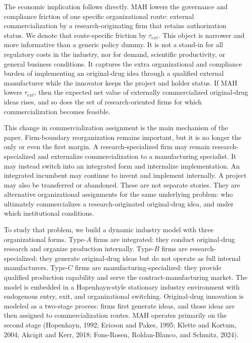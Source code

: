 The economic implication follows directly. MAH lowers the governance and compliance friction of one specific organizational route: external commercialization by a research-originating firm that retains authorization status. We denote that route-specific friction by $\tau_{ext}$. This object is narrower and more informative than a generic policy dummy. It is not a stand-in for all regulatory costs in the industry, nor for demand, scientific productivity, or general business conditions. It captures the extra organizational and compliance burden of implementing an original-drug idea through a qualified external manufacturer while the innovator keeps the project and holder status. If MAH lowers $\tau_{ext}$, then the expected net value of externally commercialized original-drug ideas rises, and so does the set of research-oriented firms for which commercialization becomes feasible.

This change in commercialization assignment is the main mechanism of the paper. Firm-boundary reorganization remains important, but it is no longer the only or even the first margin. A research-specialized firm may remain research-specialized and externalize commercialization to a manufacturing specialist. It may instead switch into an integrated form and internalize implementation. An integrated incumbent may continue to invent and implement internally. A project may also be transferred or abandoned. These are not separate stories. They are alternative organizational assignments for the same underlying problem: who ultimately commercializes a research-originated original-drug idea, and under which institutional conditions.

To study that problem, we build a dynamic industry model with three organizational forms. Type-$A$ firms are integrated: they conduct original-drug research and organize production internally. Type-$B$ firms are research-specialized: they generate original-drug ideas but do not operate as full internal manufacturers. Type-$C$ firms are manufacturing-specialized: they provide qualified production capability and serve the contract-manufacturing market. The model is embedded in a Hopenhayn-style stationary industry environment with endogenous entry, exit, and organizational switching. Original-drug innovation is modeled as a two-stage process: firms first generate ideas, and those ideas are then assigned to commercialization routes. MAH operates primarily on the second stage {\color{red}(Hopenhayn, 1992; Ericson and Pakes, 1995; Klette and Kortum, 2004; Akcigit and Kerr, 2018; Fons-Rosen, Roldan-Blanco, and Schmitz, 2024)}.

